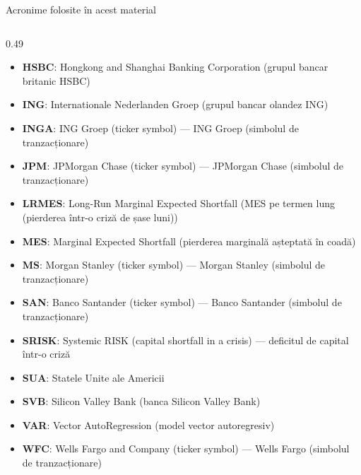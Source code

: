 \begin{frame}{Acronime folosite în acest material}
\begin{columns}[T]
\begin{column}{0.49\textwidth}
\begin{itemize}\setlength{\itemsep}{0pt}
    \item \textbf{HSBC}: Hongkong and Shanghai Banking Corporation (grupul bancar britanic HSBC)
    \item \textbf{ING}: Internationale Nederlanden Groep (grupul bancar olandez ING)
    \item \textbf{INGA}: ING Groep (ticker symbol) — ING Groep (simbolul de tranzacționare)
    \item \textbf{JPM}: JPMorgan Chase (ticker symbol) — JPMorgan Chase (simbolul de tranzacționare)
    \item \textbf{LRMES}: Long-Run Marginal Expected Shortfall (MES pe termen lung (pierderea într-o criză de șase luni))
    \item \textbf{MES}: Marginal Expected Shortfall (pierderea marginală așteptată în coadă)
    \item \textbf{MS}: Morgan Stanley (ticker symbol) — Morgan Stanley (simbolul de tranzacționare)
    \item \textbf{SAN}: Banco Santander (ticker symbol) — Banco Santander (simbolul de tranzacționare)
    \item \textbf{SRISK}: Systemic RISK (capital shortfall in a crisis) — deficitul de capital într-o criză
    \item \textbf{SUA}: Statele Unite ale Americii
    \item \textbf{SVB}: Silicon Valley Bank (banca Silicon Valley Bank)
    \item \textbf{VAR}: Vector AutoRegression (model vector autoregresiv)
    \item \textbf{WFC}: Wells Fargo and Company (ticker symbol) — Wells Fargo (simbolul de tranzacționare)
\end{itemize}
\end{column}
\end{columns}
\end{frame}

